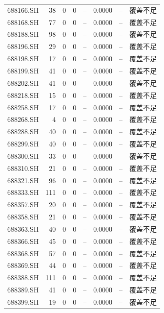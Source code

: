 \documentclass[10pt,a4paper]{article}
\begin{document}
\begin{longtable}{lrrr r r r l}
688166.SH & 38 & 0 & 0 & -- & 0.0000 & -- & 覆盖不足\\
688168.SH & 77 & 0 & 0 & -- & 0.0000 & -- & 覆盖不足\\
688188.SH & 98 & 0 & 0 & -- & 0.0000 & -- & 覆盖不足\\
688196.SH & 29 & 0 & 0 & -- & 0.0000 & -- & 覆盖不足\\
688198.SH & 17 & 0 & 0 & -- & 0.0000 & -- & 覆盖不足\\
688199.SH & 41 & 0 & 0 & -- & 0.0000 & -- & 覆盖不足\\
688202.SH & 41 & 0 & 0 & -- & 0.0000 & -- & 覆盖不足\\
688218.SH & 15 & 0 & 0 & -- & 0.0000 & -- & 覆盖不足\\
688258.SH & 17 & 0 & 0 & -- & 0.0000 & -- & 覆盖不足\\
688268.SH & 4 & 0 & 0 & -- & 0.0000 & -- & 覆盖不足\\
688288.SH & 40 & 0 & 0 & -- & 0.0000 & -- & 覆盖不足\\
688299.SH & 40 & 0 & 0 & -- & 0.0000 & -- & 覆盖不足\\
688300.SH & 33 & 0 & 0 & -- & 0.0000 & -- & 覆盖不足\\
688310.SH & 21 & 0 & 0 & -- & 0.0000 & -- & 覆盖不足\\
688321.SH & 96 & 0 & 0 & -- & 0.0000 & -- & 覆盖不足\\
688333.SH & 111 & 0 & 0 & -- & 0.0000 & -- & 覆盖不足\\
688357.SH & 20 & 0 & 0 & -- & 0.0000 & -- & 覆盖不足\\
688358.SH & 21 & 0 & 0 & -- & 0.0000 & -- & 覆盖不足\\
688363.SH & 40 & 0 & 0 & -- & 0.0000 & -- & 覆盖不足\\
688366.SH & 45 & 0 & 0 & -- & 0.0000 & -- & 覆盖不足\\
688368.SH & 57 & 0 & 0 & -- & 0.0000 & -- & 覆盖不足\\
688369.SH & 44 & 0 & 0 & -- & 0.0000 & -- & 覆盖不足\\
688388.SH & 111 & 0 & 0 & -- & 0.0000 & -- & 覆盖不足\\
688389.SH & 41 & 0 & 0 & -- & 0.0000 & -- & 覆盖不足\\
688399.SH & 19 & 0 & 0 & -- & 0.0000 & -- & 覆盖不足\\\end{longtable}\normalsize
\end{document}

